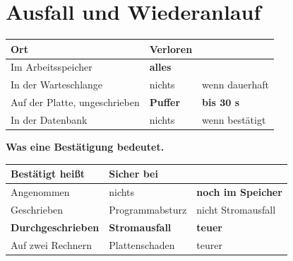 \chapter{Ausfall und Wiederanlauf}\label{kap:ausfall}

\begin{merksatz}
\begin{center}
{\small
\renewcommand{\arraystretch}{1.5}
\begin{tabular}{@{}P{2.8cm}P{2.4cm}P{2.6cm}@{}}
\toprule
\textbf{Ort} & \textbf{Verloren} & \\
\midrule
Im Arbeitsspeicher & \textcolor{akzent}{\textbf{alles}} & \\
In der Warteschlange & \textcolor{gruen}{nichts} & \textcolor{gruen}{wenn dauerhaft}\\
Auf der Platte, ungeschrieben & \textcolor{akzent}{\textbf{Puffer}} & \textcolor{akzent}{\textbf{bis $\mathbf{30}$ s}}\\
In der Datenbank & \textcolor{gruen}{nichts} & \textcolor{gruen}{wenn bestätigt}\\
\bottomrule
\end{tabular}}
\end{center}

\begin{center}
\begin{minipage}{0.88\textwidth}
\end{minipage}
\end{center}

\textbf{Was eine Bestätigung bedeutet.}

\begin{center}
{\small
\renewcommand{\arraystretch}{1.45}
\begin{tabular}{@{}P{3.0cm}P{2.4cm}P{2.6cm}@{}}
\toprule
\textbf{Bestätigt heißt} & \textbf{Sicher bei} & \\
\midrule
Angenommen & \textcolor{akzent}{nichts} & \textcolor{akzent}{\textbf{noch im Speicher}}\\
Geschrieben & Programm\-absturz & \textcolor{akzent}{nicht Stromausfall}\\
\textbf{Durchgeschrieben} & \textbf{Stromausfall} & \textcolor{gruen}{\textbf{teuer}}\\
Auf zwei Rechnern & Plattenschaden & \textcolor{gruen}{teurer}\\
\bottomrule
\end{tabular}}
\end{center}


\end{merksatz}

